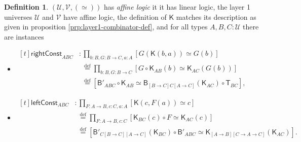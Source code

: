 \documentclass[a4paper]{article}
\theoremstyle{definition}
\newtheorem{definition}{Definition}[section]
\theoremstyle{remark}
\newcommand{\defn}{\emph}
\newcommand{\eqDef}{\overset{\text{def}}{=}}
\renewcommand{\equiv}{\simeq}
\newcommand{\U}{\mathcal{U}}
\newcommand{\V}{\mathcal{V}}
\newcommand{\nm}{\mathsf}
\newcommand{\combinator}{\nm}
\newcommand{\revAppFun}{\combinator{T}}
\newcommand{\constFun}{\combinator{K}}
\newcommand{\compFun}{\combinator{B'}}
\newcommand{\revCompFun}{\combinator{B}}
\newcommand{\rightConst}{\nm{rightConst}}
\newcommand{\leftConst}{\nm{leftConst}}
\begin{document}
\begin{definition}
  $(\U,\V,(\equiv))$ has \defn{affine logic} it it has linear logic, the layer 1 universes $\U$ and
  $\V$ have affine logic, the definition of $\constFun$ matches its description as given in
  proposition \ref{prp:layer1-combinator-def}, and for all types $A,B,C : \U$ there are instances
  \begin{itemize}
    \item $\begin{aligned}[t]
      \rightConst_{ABC} &: \prod_{b : B, G : B \to C, a : A} [G(\constFun(b,a)) \equiv G(b)]\\
                        &\ \ \eqDef \prod_{b : B, G : B \to C} [G \circ \constFun_{AB}(b) \equiv \constFun_{AC}(G(b))]\\
                        &\ \ \eqDef [\compFun_{ABC} \circ \constFun_{AB} \equiv \revCompFun_{[B{\to}C]C[A{\to}C]}(\constFun_{AC}) \circ \revAppFun_{BC}],
    \end{aligned}$
    \item $\begin{aligned}[t]
      \leftConst_{ABC} &: \prod_{F : A \to B, c : C, a : A} [\constFun(c,F(a)) \equiv c]\\
                       &\ \ \eqDef \prod_{F : A \to B, c : C} [\constFun_{BC}(c) \circ F \equiv \constFun_{AC}(c)]\\
                       &\ \ \eqDef [\compFun_{C[B{\to}C][A{\to}C]}(\constFun_{BC}) \circ \compFun_{ABC} \equiv \constFun_{[A{\to}B][C{\to}A{\to}C]}(\constFun_{AC})].
    \end{aligned}$
  \end{itemize}


\end{definition}
\end{document}
